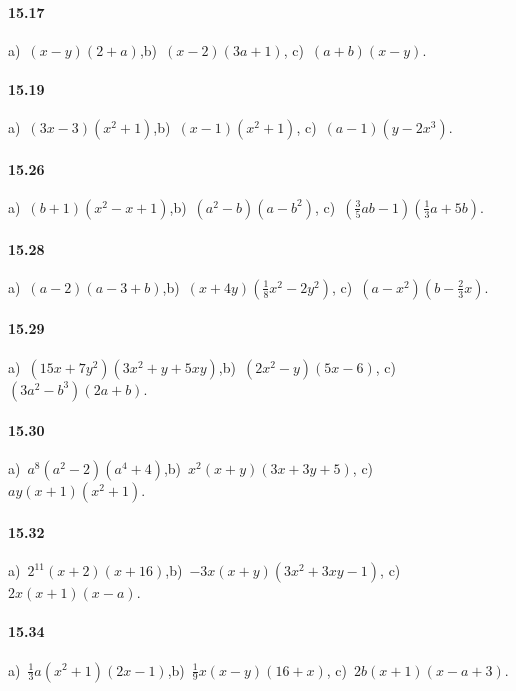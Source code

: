 \paragraph{15.17}
a)~$(x-y)(2+a)$,\quad b)~$(x-2)(3a+1)$, \quad c)~$(a+b)(x-y)$.

\paragraph{15.19}
a)~$(3x-3)\left(x^2+1\right)$,\quad b)~$(x-1)\left(x^{2}+1\right)$, \quad c)~$(a-1)\left(y-2x^{3}\right)$.

\paragraph{15.26}
a)~$(b+1)(x^{2}-x+1)$,\quad b)~$\left(a^{2}-b\right)\left(a-b^{2}\right)$, \quad c)~$\left(\frac{3}{5}ab-1\right)\left(\frac{1}{3}a+5b\right)$.

\paragraph{15.28}
a)~$(a-2)(a-3+b)$,\quad b)~$(x+4y)\left(\frac{1}{8}x^2-2y^2\right)$, \quad c)~$\left(a-x^2\right)\left(b-\frac{2}{3}x\right)$.

\paragraph{15.29}
a)~$\left(15x+7y^{2}\right)\left(3x^{2}+y+5xy\right)$,\quad b)~$\left(2x^2-y\right)(5x-6)$, \quad c)~$(3a^2-b^3)(2a+b)$.

\paragraph{15.30}
a)~$a^{8}\left(a^{2}-2\right)\left(a^{4}+4\right)$,\quad b)~$x^{2}(x+y)(3x+3y+5)$, \quad c)~$ay(x+1)(x^{2}+1)$.

\paragraph{15.32}
a)~$2^{11}(x+2)(x+16)$,\quad b)~$-3x(x+y)\left(3x^2+3xy-1\right)$, \quad c)~$2x(x+1)(x-a)$.

\paragraph{15.34}
a)~$\frac{1}{3}a(x^{2}+1)(2x-1)$,\quad b)~$\frac{1}{9}x(x-y)(16+x)$, \quad c)~$2b(x+1)(x-a+3)$.
